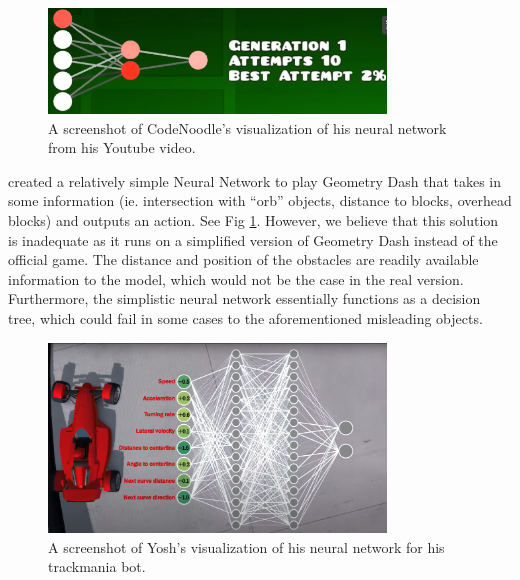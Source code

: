 \documentclass{article} %
\begin{document}
\begin{figure}[h]
\begin{center}
\includegraphics[width=0.8\textwidth]{Figs/CodeNoodlesScreenshot.png}
\end{center}
\caption{A screenshot of CodeNoodle's visualization of his neural network
from his Youtube video. 
\citep{AI+Learns+to+Play+GD}}
\label{fig:Code_Noodles}
\end{figure}

\cite{AI+Learns+to+Play+GD} created a relatively simple 
Neural Network to play Geometry Dash that takes in 
some information (ie. intersection with  “orb” objects, 
distance to blocks, overhead blocks) and outputs an action.
See Fig \ref{fig:Code_Noodles}.
However, we believe 
that this solution is inadequate as it runs on a simplified 
version of Geometry Dash instead of the official game. The 
distance and position of the obstacles are readily available 
information to the model, which would not be the case in the 
real version. Furthermore, the simplistic neural network 
essentially functions as a decision tree, which could fail 
in some cases to the aforementioned misleading objects.

\begin{figure}[h]
\begin{center}
\includegraphics[width=0.8\textwidth]{Figs/Trackmania_AI_neural_network.png}
\end{center}
\caption{A screenshot of Yosh's visualization of his neural network
for his trackmania bot. 
\citep{Trackmania+AI}}
\label{fig:Trackmania_AI}
\end{figure}
\end{document}
